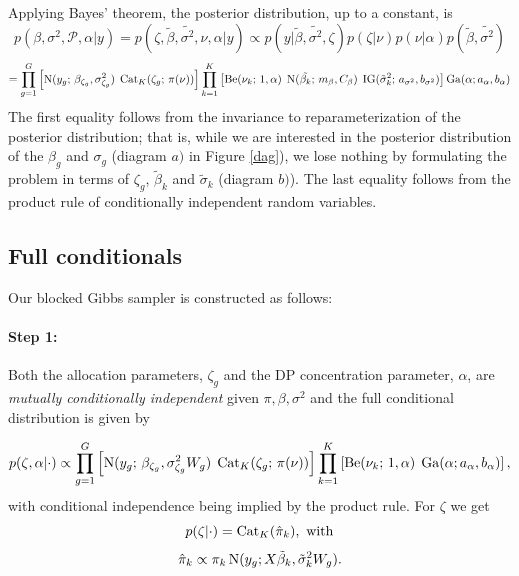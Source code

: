 {Applying Bayes' theorem, the posterior distribution, up to a constant, is
\begin{equation*}
p(\beta,\sigma^2,\mathcal{P},\alpha|y) = p(\zeta, \tilde{\beta},\tilde{\sigma^2},\nu,\alpha | y) \propto p(y|\tilde{\beta},\tilde{\sigma^2},\zeta) p(\zeta|\nu) p(\nu|\alpha)p(\tilde{\beta},\tilde{\sigma^2})
\end{equation*}
\begin{equation*}
= \prod_{g=1}^G \left[ \operatorname{N}(y_g;\,\beta_{\zeta_g},\sigma^2_{\zeta_g})\; \operatorname{Cat}_K(\zeta_g;\, \pi(\nu)) \right] \prod_{k=1}^K \left[ \operatorname{Be}(\nu_k;\, 1, \alpha)\; \operatorname{N}(\tilde{\beta_k};\,m_\beta, C_\beta)\;\operatorname{IG}(\tilde{\sigma}^2_k;\,a_{\sigma^2},b_{\sigma^2})\right] \operatorname{Ga}(\alpha;a_\alpha,b_\alpha)
\end{equation*}
The first equality follows from the  invariance to reparameterization of the posterior distribution; that is, while we are interested in the posterior distribution of the $\beta_g$ and $\sigma_g$ (diagram $a)$ in Figure \ref{dag}), we lose nothing by formulating the problem in terms of $\zeta_g$, $\tilde{\beta}_k$ and $\tilde{\sigma}_k$ (diagram $b)$). The last equality follows from the product rule of conditionally independent random variables.

\subsection{Full conditionals}
\label{subsec:full-cond}
Our blocked Gibbs sampler is constructed as follows:
\paragraph{Step 1:}
Both the allocation parameters, $\zeta_g$ and the DP concentration parameter, $\alpha$, are \textit{mutually conditionally independent} given $\pi, \beta, \sigma^2$ and the full conditional distribution is given by

\begin{equation}
p(\zeta, \alpha|\cdot) \propto \prod_{g=1}^G \left[ \operatorname{N}(y_g;\,\beta_{\zeta_g},\sigma^2_{\zeta_g}W_g)\; \operatorname{Cat}_K(\zeta_g;\, \pi(\nu)) \right] \prod_{k=1}^K \left[ \operatorname{Be}(\nu_k;\, 1, \alpha)\; \operatorname{Ga}(\alpha;a_\alpha,b_\alpha)\right],
\end{equation}
with conditional independence being implied by the product rule. For $\zeta$ we get
\begin{equation}
\label{zetafull}
p(\zeta|\cdot) = \operatorname{Cat}_K(\hat{\pi}_k), \mbox{ with}
\end{equation}
\begin{equation*}
\hat{\pi}_k \propto \pi_k \operatorname{N}(y_g;X\tilde{\beta}_k,\tilde{\sigma}_k^2 W_g).
\end{equation*}

}
